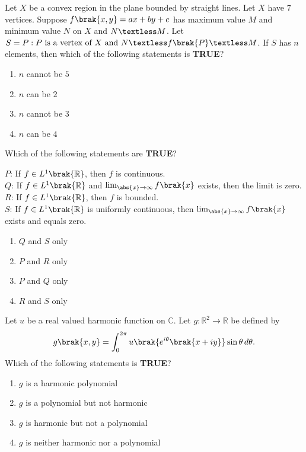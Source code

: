     \item Let $X$ be a convex region in the plane bounded by straight lines. Let $X$ have $7$ vertices. Suppose $f \brak{x, y} = ax + by + c$ has maximum value $M$ and minimum value $N$ on $X$ and $N \textless M$. Let $S = {P: P \text{ is a vertex of } X \text{ and } N \textless f \brak{P} \textless M}$. If $S$ has $n$ elements, then which of the following statements is \textbf{TRUE}?
    \begin{enumerate}
        \item $n$ cannot be $5$
        \item $n$ can be $2$
        \item $n$ cannot be $3$
        \item $n$ can be $4$
    \end{enumerate}

    \item Which of the following statements are \textbf{TRUE}?
    
    $P$: If $f \in L^1 \brak{\mathbb{R}}$, then $f$ is continuous. \\
    $Q$: If $f \in L^1 \brak{\mathbb{R}}$ and $\lim_{\abs{x} \to \infty} f \brak{x}$ exists, then the limit is zero. \\
    $R$: If $f \in L^1 \brak{\mathbb{R}}$, then $f$ is bounded. \\
    $S$: If $f \in L^{1} \brak{\mathbb{R}}$ is uniformly continuous, then $\lim_{\abs{x} \to \infty} f \brak{x}$ exists and equals zero.
    
    \begin{enumerate}
        \item $Q$ and $S$ only
        \item $P$ and $R$ only
        \item $P$ and $Q$ only
        \item $R$ and $S$ only
    \end{enumerate}

    \item Let $u$ be a real valued harmonic function on $\mathbb{C}$. Let $g: \mathbb{R}^{2} \rightarrow \mathbb{R}$ be defined by
    \[
    g \brak{x, y} = \int_{0}^{2 \pi} u \brak{e^{i \theta} \brak{x + iy}} \sin \theta \, d \theta.
    \]
    Which of the following statements is \textbf{TRUE}?
    \begin{enumerate}
        \item $g$ is a harmonic polynomial
        \item $g$ is a polynomial but not harmonic
        \item $g$ is harmonic but not a polynomial
        \item $g$ is neither harmonic nor a polynomial
    \end{enumerate}

